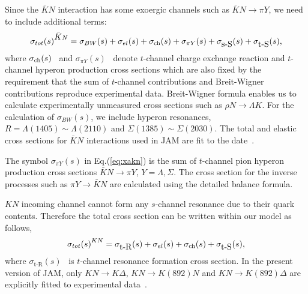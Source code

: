 \documentclass[]{article}
\newcommand{\Kbar}{\mbox{${\bar K}$}}
\newcommand{\sigtot}{\mbox{$\sigma_{tot}(s)$}}
\newcommand{\sigel}{\mbox{$\sigma_{el}(s)$}}
\newcommand{\sigtR}{\mbox{$\sigma_{\mbox{t-R}}(s)$}}
\newcommand{\sigtS}{\mbox{$\sigma_{\mbox{t-S}}(s)$}}
\newcommand{\sigbw}{\mbox{$\sigma_{BW}(s)$}}
\newcommand{\sigsS}{\mbox{$\sigma_{\mbox{s-S}}(s)$}}
\newcommand{\sigpiY}{\mbox{$\sigma_{\pi Y}(s)$}}
\newcommand{\sigch}{\mbox{$\sigma_{{\rm ch}}(s)$}}
\begin{document}
Since the $\Kbar N$ interaction
has some exoergic channels %
such as $\Kbar N\to \pi Y$,
we need to include additional terms:
\begin{equation}
 \sigtot^{\Kbar N}=\sigbw+\sigel+\sigch+\sigpiY+\sigsS+\sigtS,
\label{eq:xakn}
\end{equation}
where \sigch~ and \sigpiY~ denote $t$-channel charge exchange reaction
  and $t$-channel hyperon production cross sections
  which are also fixed by the requirement that
  the sum of $t$-channel contributions and
  Breit-Wigner contributions reproduce experimental data.
%
Breit-Wigner formula enables us to calculate
  experimentally unmeasured cross sections
  such as $\rho N \to \Lambda K$.
For the calculation of \sigbw,
we include hyperon resonances,
      $R=\Lambda(1405)\sim\Lambda(2110)$
      and 
      $\Sigma(1385)\sim\Sigma(2030)$.
The total and elastic cross sections for $\Kbar N$ interactions
 used in JAM are fit to the date~\cite{PDG96}.


The symbol $\sigma_{\pi Y}(s)$ in Eq.(\ref{eq:xakn})
 is the sum of $t$-channel pion hyperon production
cross sections $\Kbar N\to \pi Y$, $Y=\Lambda,\Sigma$.
The cross section for the inverse processes such as $\pi Y\to  \Kbar N$ are
calculated using the detailed balance formula.


$KN$ incoming channel cannot form any $s$-channel resonance
 due to their quark contents. Therefore
the total cross section can be written within our model as follows, 
\begin{equation}
 \sigtot^{KN}=\sigtR+\sigel+\sigch +\sigtS,
\end{equation}
where \sigtR~ is $t$-channel resonance formation cross section.
%
%
In the present version of JAM,
only $K N\to K\Delta$, $K N\to K(892)N$ and $K N \to K(892)\Delta$
are explicitly fitted to experimental data~\cite{CernHera}.

\end{document}
